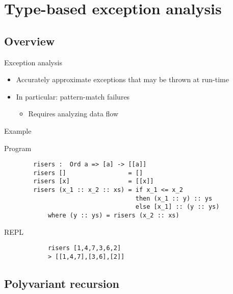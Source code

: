 \documentclass{beamer}
\begin{document}
\section{Type-based exception analysis}

\subsection{Overview}

\begin{frame}{Exception analysis}
	\begin{itemize}
		\item Accurately approximate exceptions that may be thrown at run-time
		\item In particular: pattern-match failures
		\begin{itemize}
			\item Requires analyzing data flow
		\end{itemize}
	\end{itemize}
\end{frame}

\begin{frame}[fragile]{Example}
	\begin{block}{Program}
	\begin{verbatim}
		risers :  Ord a => [a] -> [[a]]
		risers []                 = []
		risers [x]                = [[x]]
		risers (x_1 :: x_2 :: xs) = if x_1 <= x_2
		                            then (x_1 :: y) :: ys
		                            else [x_1] :: (y :: ys)
		    where (y :: ys) = risers (x_2 :: xs)
	\end{verbatim}
	\end{block}
	\begin{block}{REPL}
		\begin{verbatim}
			risers [1,4,7,3,6,2]
			> [[1,4,7],[3,6],[2]]
		\end{verbatim}
	\end{block}
\end{frame}

\subsection{Polyvariant recursion}
\end{document}
